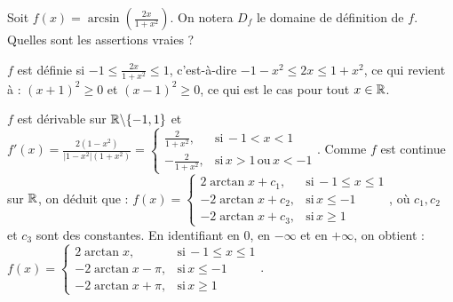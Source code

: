 \begin{question} 
Soit $f(x)= \arcsin (\frac{2x}{1+x^2})$. On notera $D_f$ le domaine de définition de $f$. Quelles sont les assertions vraies ?
\begin{answers}
    



  
\end{answers}
\begin{explanations}
$f$ est définie si $-1\le \frac{2x}{1+x^2} \le 1 $, c'est-à-dire $-1-x^2 \le 2x \le 1+x^2$, ce qui revient à : $(x+1)^2\ge 0$ et $(x-1)^2\ge 0$, ce qui est le cas pour tout $x \in \mathbb{R}$.

$f$ est dérivable sur $\mathbb{R} \backslash \{-1,1\}$ et 
$f'(x) = \frac{2(1-x^2)}{|1-x^2|(1+x^2)} = \left\{\begin{array}{cc}\frac{2}{1+x^2},& \mbox{si} \, -1 < x < 1 \\ -\frac{2}{1+x^2},& \mbox{si} \, x > 1 \, \mbox{ou} \, x < -1 \end{array}\right. $. Comme $f$ est continue sur $\mathbb{R}$, on déduit que : 
$f(x)= \left\{\begin{array}{ccc}2\arctan x + c_1, & \mbox{si} \, -1\le x\le 1 \\ -2\arctan x + c_2, & \mbox{si} \, x\le -1 \\ -2\arctan x + c_3, & \mbox{si} \, x\ge 1 \end{array}\right.$, où $c_1, c_2$ et $c_3$ sont des constantes.
En identifiant en $0$, en $-\infty$ et en $+\infty$, on obtient : 
$f(x)= \left\{\begin{array}{ccc}2\arctan x, & \mbox{si} \, -1\le x\le 1 \\ -2\arctan x -\pi, & \mbox{si} \, x\le -1 \\ -2\arctan x +\pi, & \mbox{si} \, x\ge 1 \end{array}\right.$.
\end{explanations}

\end{question}


